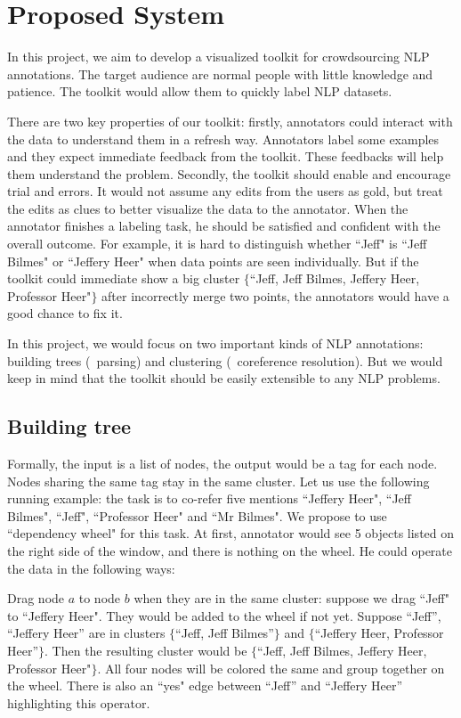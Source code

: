 \section{Proposed System}

In this project, we aim to develop a visualized toolkit for crowdsourcing NLP annotations. The target audience are normal people with little knowledge and patience. The toolkit would allow them to quickly label NLP datasets.

There are two key properties of our toolkit: firstly, annotators could interact with the data to understand them in a refresh way. Annotators label some examples and they expect immediate feedback from the toolkit. These feedbacks will help them understand the problem. Secondly, the toolkit should enable and encourage trial and errors. It would not assume any edits from the users as gold, but treat the edits as clues to better visualize the data to the annotator. When the annotator finishes a labeling task, he should be satisfied and confident with the overall outcome. For example, it is hard to distinguish whether ``Jeff" is ``Jeff Bilmes" or ``Jeffery Heer" when data points are seen individually. But if the toolkit could immediate show a big cluster $\{$``Jeff, Jeff Bilmes, Jeffery Heer, Professor Heer"$\}$ after incorrectly merge two points, the annotators would have a good chance to fix it.

 In this project, we would focus on two important kinds of NLP annotations: building trees (\eg\  parsing) and clustering (\eg\ coreference resolution). But we would keep in mind that the toolkit should be easily extensible to any NLP problems. 

\subsection{Building tree}
Formally, the input is a list of nodes, the output would be a tag for each node. Nodes sharing the same tag stay in the same cluster. Let us use the following running example: the task is to co-refer five mentions ``Jeffery Heer", ``Jeff Bilmes", ``Jeff", ``Professor Heer" and ``Mr Bilmes". We propose to use ``dependency wheel" for this task. At first, annotator would see 5 objects listed on the right side of the window, and there is nothing on the wheel. He could operate the data in the following ways:

Drag node $a$ to node $b$ when they are in the same cluster: suppose we drag ``Jeff" to ``Jeffery Heer". They would be added to the wheel if not yet. Suppose ``Jeff'', ``Jeffery Heer'' are in clusters $\{$``Jeff, Jeff Bilmes''$\}$ and $\{$``Jeffery Heer, Professor Heer''$\}$. Then the resulting cluster would be $\{$``Jeff, Jeff Bilmes, Jeffery Heer, Professor Heer"$\}$. All four nodes will be colored the same and group together on the wheel. There is also an ``yes" edge between ``Jeff'' and ``Jeffery Heer'' highlighting this operator. 

